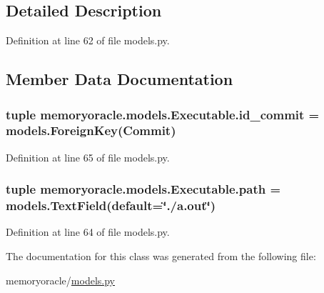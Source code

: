 \subsection{Detailed Description}


Definition at line 62 of file models.\+py.



\subsection{Member Data Documentation}
\hypertarget{classmemoryoracle_1_1models_1_1Executable_a63ec6fcf966d713361d30913dbeb2815}{}
\subsubsection[{id\+\_\+commit}]{\setlength{\rightskip}{0pt plus 5cm}tuple memoryoracle.\+models.\+Executable.\+id\+\_\+commit = models.\+Foreign\+Key({\bf Commit})\hspace{0.3cm}{\ttfamily [static]}}\label{classmemoryoracle_1_1models_1_1Executable_a63ec6fcf966d713361d30913dbeb2815}


Definition at line 65 of file models.\+py.

\hypertarget{classmemoryoracle_1_1models_1_1Executable_a2ab97065889225c1d050784a374fab8a}{}
\subsubsection[{path}]{\setlength{\rightskip}{0pt plus 5cm}tuple memoryoracle.\+models.\+Executable.\+path = models.\+Text\+Field(default=\char`\"{}./a.\+out\char`\"{})\hspace{0.3cm}{\ttfamily [static]}}\label{classmemoryoracle_1_1models_1_1Executable_a2ab97065889225c1d050784a374fab8a}


Definition at line 64 of file models.\+py.



The documentation for this class was generated from the following file\+:\begin{DoxyCompactItemize}
\item 
memoryoracle/\hyperlink{models_8py}{models.\+py}\end{DoxyCompactItemize}
